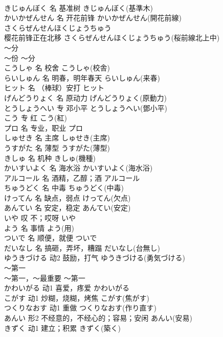 \documentclass[8pt]{extreport}
\begin{document}
\begin{CJK}{UTF8}{min}
\\	きじゅんぼく	名	基准树	きじゅんぼく(基準木)	
\\	かいかぜんせん	名	开花前锋	かいかぜんせん(開花前線)	
\\	さくらぜんせんほくじょうちゅう	
\\	樱花前锋正在北移	さくらぜんせんほくじょうちゅう(桜前線北上中)	
\\	～分	
\\	～份	～分	
\\	こうしゃ	名	校舍	こうしゃ(校舎)	
\\	らいしゅん	名	明春，明年春天	らいしゅん(来春)	
\\	ヒット	名	（棒球）安打	ヒット	
\\	げんどうりょく	名	原动力	げんどうりょく(原動力)	
\\	とうしょうへい	专	邓小平	とうしょうへい(鄧小平)	
\\	こう	专	红	こう(紅)	
\\	プロ	名	专业，职业	プロ	
\\	しゅせき	名	主席	しゅせき(主席)	
\\	うすがた	名	薄型	うすがた(薄型)	
\\	きしゅ	名	机种	きしゅ(機種)	
\\	かいすいよく	名	海水浴	かいすいよく(海水浴)	
\\	アルコール	名	酒精，乙醇；酒	アルコール	
\\	ちゅうどく	名	中毒	ちゅうどく(中毒)	
\\	けってん	名	缺点，弱点	けってん(欠点)	
\\	あんてい	名	安定，稳定	あんてい(安定)	
\\	いや	叹	不；哎呀	いや	
\\	よう	名	事情	よう(用)	
\\	ついで	名	顺便，就便	ついで	
\\	だいなし	名	搞砸，弄坏，糟蹋	だいなし(台無し)	
\\	ゆうきづける	动2	鼓励，打气	ゆうきづける(勇気づける)	
\\	～第一	
\\	～第一，～最重要	～第一	
\\	かわいがる	动1	喜爱，疼爱	かわいがる	
\\	こがす	动1	炒糊，烧糊，烤焦	こがす(焦がす)	
\\	つくりなおす	动1	重做	つくりなおす(作り直す)	
\\	あんい	形2	不经意的，不经心的；容易；安闲	あんい(安易)	
\\	きずく	动1	建立；积累	きずく(築く)	

\end{CJK}
\end{document}
